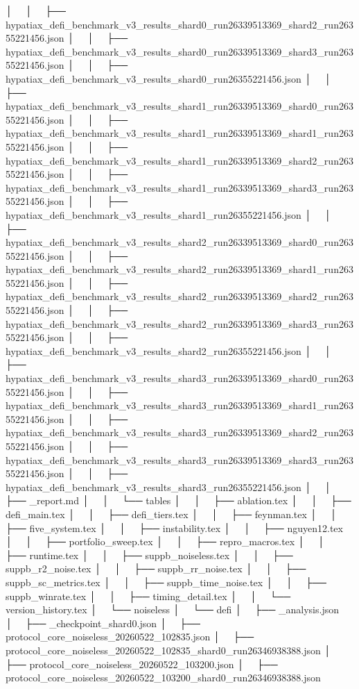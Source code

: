 │   │   ├── hypatiax_defi_benchmark_v3_results_shard0_run26339513369_shard2_run26355221456.json
│   │   ├── hypatiax_defi_benchmark_v3_results_shard0_run26339513369_shard3_run26355221456.json
│   │   ├── hypatiax_defi_benchmark_v3_results_shard0_run26355221456.json
│   │   ├── hypatiax_defi_benchmark_v3_results_shard1_run26339513369_shard0_run26355221456.json
│   │   ├── hypatiax_defi_benchmark_v3_results_shard1_run26339513369_shard1_run26355221456.json
│   │   ├── hypatiax_defi_benchmark_v3_results_shard1_run26339513369_shard2_run26355221456.json
│   │   ├── hypatiax_defi_benchmark_v3_results_shard1_run26339513369_shard3_run26355221456.json
│   │   ├── hypatiax_defi_benchmark_v3_results_shard1_run26355221456.json
│   │   ├── hypatiax_defi_benchmark_v3_results_shard2_run26339513369_shard0_run26355221456.json
│   │   ├── hypatiax_defi_benchmark_v3_results_shard2_run26339513369_shard1_run26355221456.json
│   │   ├── hypatiax_defi_benchmark_v3_results_shard2_run26339513369_shard2_run26355221456.json
│   │   ├── hypatiax_defi_benchmark_v3_results_shard2_run26339513369_shard3_run26355221456.json
│   │   ├── hypatiax_defi_benchmark_v3_results_shard2_run26355221456.json
│   │   ├── hypatiax_defi_benchmark_v3_results_shard3_run26339513369_shard0_run26355221456.json
│   │   ├── hypatiax_defi_benchmark_v3_results_shard3_run26339513369_shard1_run26355221456.json
│   │   ├── hypatiax_defi_benchmark_v3_results_shard3_run26339513369_shard2_run26355221456.json
│   │   ├── hypatiax_defi_benchmark_v3_results_shard3_run26339513369_shard3_run26355221456.json
│   │   ├── hypatiax_defi_benchmark_v3_results_shard3_run26355221456.json
│   │   ├── _report.md
│   │   └── tables
│   │       ├── ablation.tex
│   │       ├── defi_main.tex
│   │       ├── defi_tiers.tex
│   │       ├── feynman.tex
│   │       ├── five_system.tex
│   │       ├── instability.tex
│   │       ├── nguyen12.tex
│   │       ├── portfolio_sweep.tex
│   │       ├── repro_macros.tex
│   │       ├── runtime.tex
│   │       ├── suppb_noiseless.tex
│   │       ├── suppb_r2_noise.tex
│   │       ├── suppb_rr_noise.tex
│   │       ├── suppb_sc_metrics.tex
│   │       ├── suppb_time_noise.tex
│   │       ├── suppb_winrate.tex
│   │       ├── timing_detail.tex
│   │       └── version_history.tex
│   └── noiseless
│       └── defi
│           ├── _analysis.json
│           ├── _checkpoint_shard0.json
│           ├── protocol_core_noiseless_20260522_102835.json
│           ├── protocol_core_noiseless_20260522_102835_shard0_run26346938388.json
│           ├── protocol_core_noiseless_20260522_103200.json
│           ├── protocol_core_noiseless_20260522_103200_shard0_run26346938388.json
